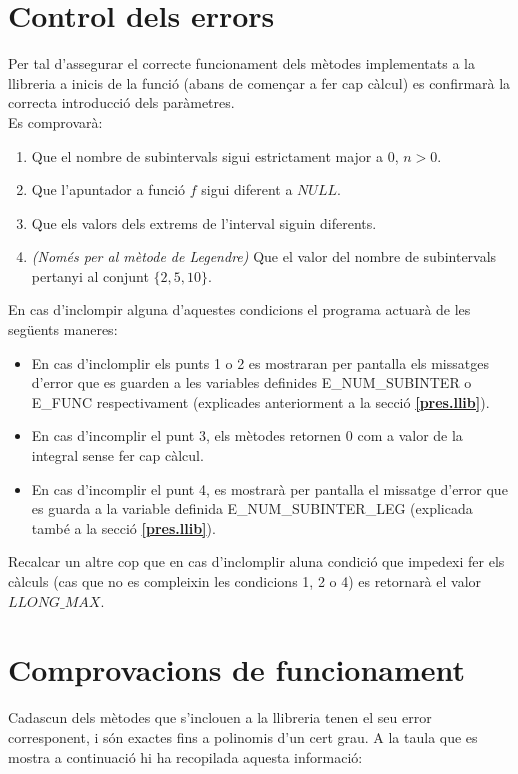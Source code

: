 \documentclass[12pt]{article}
\begin{document}
\section{Control dels errors}
Per tal d'assegurar el correcte funcionament dels mètodes implementats a la llibreria a inicis de la funció (abans de començar a fer cap càlcul) es confirmarà la correcta introducció dels paràmetres.\\
Es comprovarà:
\begin{enumerate}
    \item Que el nombre de subintervals sigui estrictament major a $0$, $n>0$.
    \item Que l'apuntador a funció $f$ sigui diferent a $NULL$.
    \item Que els valors dels extrems de l'interval siguin diferents.
    \item \textit{(Només per al mètode de Legendre)} Que el valor del nombre de subintervals pertanyi al conjunt $\{2,5,10\}$.
\end{enumerate}
En cas d'inclompir alguna d'aquestes condicions el programa actuarà de les següents maneres:
\begin{itemize}
    \item En cas d'inclomplir els punts 1 o 2 es mostraran per pantalla els missatges d'error que es guarden a les variables definides \textcolor{Dandelion}{E\_NUM\_SUBINTER} o \textcolor{Dandelion}{E\_FUNC} respectivament (explicades anteriorment a la secció \textcolor{blue}{\textbf{\ref{pres.llib}}}).
    \item En cas d'incomplir el punt 3, els mètodes retornen 0 com a valor de la integral sense fer cap càlcul.
    \item En cas d'incomplir el punt 4, es mostrarà per pantalla el missatge d'error que es guarda a la variable definida \textcolor{Dandelion}{E\_NUM\_SUBINTER\_LEG} (explicada també a la secció \textcolor{blue}{\textbf{\ref{pres.llib}}}).
\end{itemize}
Recalcar un altre cop que en cas d'inclomplir aluna condició que impedexi fer els càlculs (cas que no es compleixin les condicions 1, 2 o 4) es retornarà el valor $LLONG\_MAX$.


\newpage
\section{Comprovacions de funcionament}\label{comprovacions}
Cadascun dels mètodes que s'inclouen a la llibreria tenen el seu error corresponent, i són exactes fins a polinomis d'un cert grau. A la taula que es mostra a continuació hi ha recopilada aquesta informació:
\end{document}
